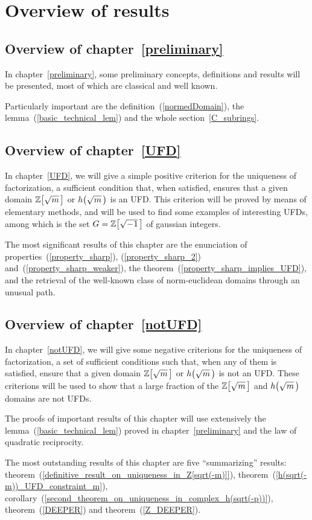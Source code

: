 \section{Overview of results}
\smallskip
\subsection*{Overview of chapter~\ref{preliminary}}
%
In chapter~\ref{preliminary}, some preliminary concepts, definitions and
results will be presented, most of which are classical and well known.

Particularly important are the definition~(\ref{normedDomain}), the
lemma~(\ref{basic_technical_lem}) and the whole section~\ref{C_subrings}.

\subsection*{Overview of chapter~\ref{UFD}}
%
In chapter~\ref{UFD}, we will give a simple positive criterion for the
uniqueness of factorization, \ie a sufficient condition that, when
satisfied, ensures that a given domain $\ZZ{m}$ or $\hh{m}$ is an UFD\@.
This criterion will be proved by means of elementary methods, and will
be used to find some examples of interesting UFDs, among which is the
set $G = \ZZM{1}$ of gaussian integers.

The most significant results of this chapter are the enunciation of
properties~(\ref{property_sharp}), (\ref{property_sharp_2})
and~(\ref{property_sharp_weaker}), the
theorem~(\ref{property_sharp_implies_UFD}), and the retrieval of the
well-known class of norm-euclidean domains through an unusual path.

\subsection*{Overview of chapter~\ref{notUFD}}
%
In chapter~\ref{notUFD}, we will give some negative criterions for the
uniqueness of factorization, \ie a set of sufficient conditions such
that, when any of them is satisfied, ensure that a given domain $\ZZ{m}$
or $\hh{m}$ is not an UFD\@.
These criterions will be used to show that a large fraction of
the $\ZZ{m}$ and $\hh{m}$ domains are not UFDs.

The proofs of important results of this chapter will use extensively
the lemma~(\ref{basic_technical_lem}) proved in chapter~\ref{preliminary}
and the law of quadratic reciprocity.

The most outstanding results of this chapter are five ``summarizing''
results:
theorem~(\ref{definitive_result_on_uniqueness_in_Z[sqrt(-m)]}),
theorem~(\ref{h(sqrt(-m))_UFD_constraint_m}),
corollary~(\ref{second_theorem_on_uniqueness_in_complex_h(sqrt(-p))}),
theorem~(\ref{DEEPER}) and
theorem~(\ref{Z_DEEPER}).

